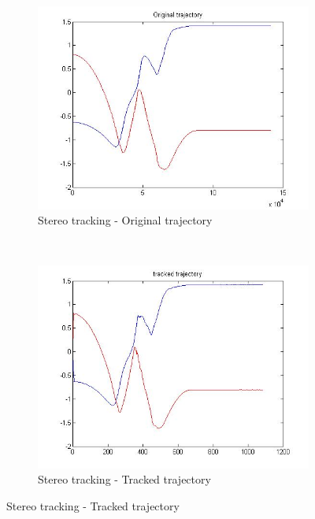 \begin{figure}[h]
	\centering
	\begin{subfigure}[b]{0.4\linewidth}
		\centering
		\includegraphics[width=\linewidth]{../Images/c3/sim3_traj_ori}
		\caption{Stereo tracking - Original trajectory}
		\label{fig:sim3_traj_ori}
	\end{subfigure}
	~
	\begin{subfigure}[b]{0.4\linewidth}
		\centering
		\includegraphics[width=\linewidth]{../Images/c3/sim3_traj_track}
		\caption{Stereo tracking - Tracked trajectory}
		\label{fig:sim3_traj_track}
	\end{subfigure}

\end{figure}




